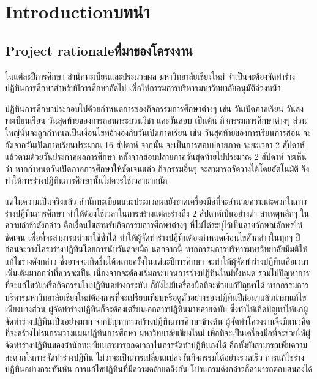 \chapter{\ifenglish Introduction\else บทนำ\fi}

\section{\ifenglish Project rationale\else ที่มาของโครงงาน\fi}
ในแต่ละปีการศึกษา สำนักทะเบียนและประมวลผล มหาวิทยาลัยเชียงใหม่ จำเป็นจะต้องจัดทำร่างปฏิทินการศึกษาสำหรับปีการศึกษาถัดไป เพื่อให้กรรมการบริหารมหาวิทยาลัยอนุมัติล่วงหน้า

ปฏิทินการศึกษาประกอบไปด้วยกำหนดการของกิจกรรมการศึกษาต่างๆ เช่น วันเปิดภาคเรียน วันลงทะเบียนเรียน วันสุดท้ายของการถอนกระบวนวิชา และวันสอบ เป็นต้น
%
กิจกรรมการศึกษาต่างๆ ส่วนใหญ่นั้นจะถูกกำหนดเป็นเงื่อนไขที่อ้างอิงกับวันเปิดภาคเรียน เช่น วันสุดท้ายของการเรียนการสอน จะถัดจากวันเปิดภาคเรียนประมาณ 16 สัปดาห์ จากนั้น จะเป็นการสอบปลายภาค ระยะเวลา 2 สัปดาห์ แล้วตามด้วยวันประกาศผลการศึกษา หลังจากสอบปลายภาควันสุดท้ายไปประมาณ 2 สัปดาห์
%
จะเห็นว่า หากกำหนดวันเปิดภาคการศึกษาให้ชัดเจนแล้ว กิจกรรมอื่นๆ จะสามารถจัดวางได้โดยอัตโนมัติ จึงทำให้การร่างปฏิทินการศึกษานั้นไม่ควรใช้เวลามากนัก

แต่ในความเป็นจริงแล้ว สำนักทะเบียนและประมวลผลยังขาดเครื่องมือที่จะอำนวยความสะดวกในการร่างปฏิทินการศึกษา ทำให้ต้องใช้เวลาในการสร้างแต่ละร่างถึง 2 สัปดาห์เป็นอย่างต่ำ
%
สาเหตุหลักๆ ในความล่าช้าดังกล่าว คือเงื่อนไขสำหรับกิจกรรมการศึกษาต่างๆ ที่ไม่ได้ระบุไว้เป็นลายลักษณ์อักษรให้ชัดเจน เพื่อที่จะสามารถนำมาใช้ซ้ำได้ ทำให้ผู้จัดทำร่างปฏิทินต้องกำหนดเงื่อนไขดังกล่าวในทุกๆ ปี ก่อนจะวางโครงร่างปฏิทินโดยการนับวันด้วยมือ
%
นอกจากนี้ หากกรรมการบริหารมหาวิทยาลัยมีมติให้แก้ไขร่างดังกล่าว ซึ่งอาจจะเกิดขึ้นได้หลายครั้งในแต่ละปีการศึกษา จะทำให้ผู้จัดทำร่างปฏิทินเสียเวลาเพิ่มเติมมากกว่าที่ควรจะเป็น เนื่องจากจะต้องเริ่มกระบวนการร่างปฏิทินใหม่ทั้งหมด
%
รวมไปปัญหาการที่จะแก้ไขวันหรือกิจกรรมในปฏิทินอย่างกระทัน ก็ยังไม่มีเครื่องมือที่จะช่วยแก้ปัญหาได้ หากกรรมการบริหารมหาวิทยาลัยเชียงใหม่ต้องการที่จะเปรียบเทียบหรือดูตัวอย่างของปฏิทินปีก่อนๆแล้วนำมาแก้ไขเพียงบางส่วน ผู้จัดทำร่างปฏิทินก็จะต้องเตรียมเอกสารปฏิทินมาหลายฉบับ ซึ่งทำให้เกิดปัญหาให้แก่ผู้จัดทำร่างปฏิทินเป็นอย่างมาก
%
จากปัญหาการสร้างปฏิทินการศึกษาข้างต้น ผู้จัดทำโครงงานจึงมีแนวคิดที่จะสร้างโปรแกรมวางแผนปฏิทินการศึกษา มหาวิทยาลัยเชียงใหม่  
%
เพื่อที่จะเป็นเครื่องมือที่จะช่วยให้ผู้จัดทำร่างปฏิทินของสำนักทะเบียนสามารถลดเวลาในการจัดทำปฏิทินลงได้
%
อีกทั้งยังสามารถเพิ่มความสะดวกในการจัดทำร่างปฏิทิน ไม่ว่าจะเป็นการเปลี่ยนแปลงวันกิจกรรมได้อย่างรวดเร็ว การแก้ไขร่างปฏิทินอย่างกระทันหัน การแก้ไขปฏิทินที่มีความคล้ายคลึงกัน โปรแกรมดังกล่าวก็สามารถตอบสนองได้ 

